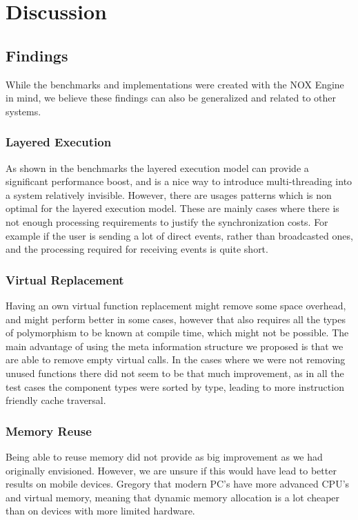 \chapter{Discussion}
\label{chap:discussion}

\section{Findings}
While the benchmarks and implementations were created with the NOX Engine in mind,
we believe these findings can also be generalized and related to other systems.

\subsection{Layered Execution}
As shown in the benchmarks the layered execution model can provide a significant performance boost,
and is a nice way to introduce multi-threading into a system relatively invisible.
However, there are usages patterns which is non optimal for the layered execution model.
These are mainly cases where there is not enough processing requirements to justify the synchronization costs.
For example if the user is sending a lot of direct events, rather than broadcasted ones,
and the processing required for receiving events is quite short.

\subsection{Virtual Replacement}
Having an own virtual function replacement might remove some space overhead, and might perform better in some cases,
however that also requires all the types of polymorphism to be known at compile time, which might
not be possible.
The main advantage of using the meta information structure we proposed is that we are able to remove empty
virtual calls.
In the cases where we were not removing unused functions there did not seem to be that much improvement,
as in all the test cases the component types were sorted by type, leading to more instruction friendly cache
traversal.

\subsection{Memory Reuse}
Being able to reuse memory did not provide as big improvement as we had originally envisioned.
However, we are unsure if this would have lead to better results on mobile devices.
Gregory\cite[p.262]{game_engine_architecture} that modern PC's have more advanced CPU's and virtual
memory, meaning that dynamic memory allocation is a lot cheaper than on devices with more limited hardware.

